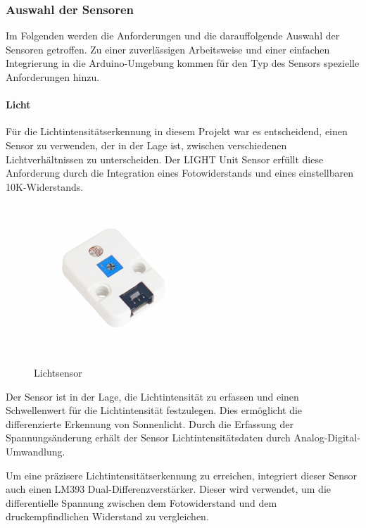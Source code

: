 \subsubsection{Auswahl der Sensoren}
Im Folgenden werden die Anforderungen und die darauffolgende Auswahl der Sensoren getroffen. Zu einer zuverlässigen Arbeitsweise und einer einfachen Integrierung in die Arduino-Umgebung kommen für den Typ des Sensors spezielle Anforderungen hinzu.

\paragraph{Licht}
Für die Lichtintensitätserkennung in diesem Projekt war es entscheidend, einen Sensor zu verwenden, der in der Lage ist, zwischen verschiedenen Lichtverhältnissen zu unterscheiden. Der LIGHT Unit Sensor erfüllt diese Anforderung durch die Integration eines Fotowiderstands und eines einstellbaren 10K-Widerstands.\cite{m5stack-light-sensor}

\begin{figure}[H]
\centering
\includegraphics[width=0.5\textwidth]{images/LichtSensor.jpg}
\caption{Lichtsensor}\cite{rainpoint_smart_timer}
\label{fig:rainpointDiagram}
\end{figure}

Der Sensor ist in der Lage, die Lichtintensität zu erfassen und einen Schwellenwert für die Lichtintensität festzulegen. Dies ermöglicht die differenzierte Erkennung von Sonnenlicht. Durch die Erfassung der Spannungsänderung erhält der Sensor Lichtintensitätsdaten durch Analog-Digital-Umwandlung.

Um eine präzisere Lichtintensitätserkennung zu erreichen, integriert dieser Sensor auch einen LM393 Dual-Differenzverstärker. Dieser wird verwendet, um die differentielle Spannung zwischen dem Fotowiderstand und dem druckempfindlichen Widerstand zu vergleichen.

